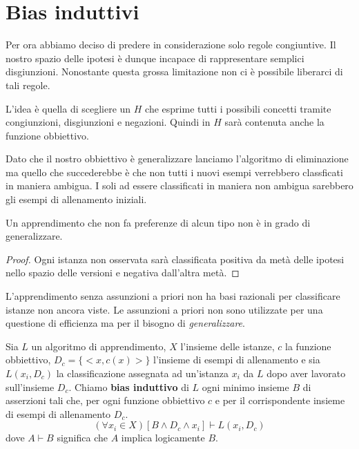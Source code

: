\section{Bias induttivi}
Per ora abbiamo deciso di predere in considerazione solo regole congiuntive. Il nostro spazio delle ipotesi \`e dunque
incapace di rappresentare semplici disgiunzioni. Nonostante questa grossa limitazione non ci \`e possibile liberarci
di tali regole.

L'idea \`e quella di scegliere un $H$ che esprime tutti i possibili concetti tramite congiunzioni, disgiunzioni e negazioni.
Quindi in $H$ sar\`a contenuta anche la funzione obbiettivo.

Dato che il nostro obbiettivo \`e generalizzare lanciamo l'algoritmo di eliminazione ma quello che succederebbe \`e che non
tutti i nuovi esempi verrebbero classficati in maniera ambigua. I soli ad essere classificati in maniera non ambigua
sarebbero gli esempi di allenamento iniziali.

\begin{theorem}
	Un apprendimento che non fa preferenze di alcun tipo non \`e in grado di generalizzare.
	\begin{proof}
		Ogni istanza non osservata sar\`a classificata positiva da met\`a delle ipotesi nello spazio delle versioni e
		negativa dall'altra met\`a.
	\end{proof}
\end{theorem}

L'apprendimento senza assunzioni a priori non ha basi razionali per classificare istanze non ancora viste. Le assunzioni
a priori non sono utilizzate per una questione di efficienza ma per il bisogno di \emph{generalizzare}.

\begin{definition}
	Sia $L$ un algoritmo di apprendimento, $X$ l'insieme delle istanze, $c$ la funzione obbiettivo, $D_c = \{<x, c(x)>\}$
	l'insieme di esempi di allenamento e sia $L(x_i, D_c)$ la classificazione assegnata ad un'istanza $x_i$ da $L$ dopo
	aver lavorato sull'insieme $D_c$. Chiamo \textbf{bias induttivo} di $L$ ogni minimo insieme $B$ di asserzioni tali che,
	per ogni funzione obbiettivo $c$ e per il corrispondente insieme di esempi di allenamento $D_c$.
	\[ (\forall x_i \in X) [B \wedge D_c \wedge x_i] \vdash L(x_i, D_c) \]
	dove $A \vdash B$ significa che $A$ implica logicamente $B$.
\end{definition}